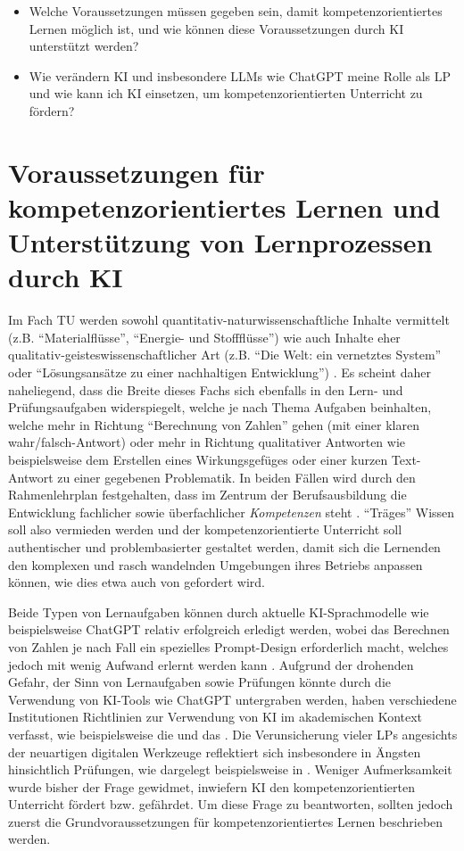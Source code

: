 \begin{itemize}
\item Welche Voraussetzungen müssen gegeben sein, damit kompetenzorientiertes Lernen möglich ist, und wie können diese Voraussetzungen durch \gls{KI} unterstützt werden?
\item Wie verändern \gls{KI} und insbesondere \glspl{LLM} wie ChatGPT meine Rolle als \gls{LP} und wie kann ich \gls{KI} einsetzen, um kompetenzorientierten Unterricht zu fördern?
\end{itemize}

\section{Voraussetzungen für kompetenzorientiertes Lernen und Unterstützung von Lernprozessen durch \gls{KI}}

Im Fach \gls{TU} werden sowohl quantitativ-naturwissenschaftliche Inhalte vermittelt (z.B. ``Materialflüsse'', ``Energie- und Stoffflüsse'') wie auch Inhalte eher qualitativ-geisteswissenschaftlicher Art (z.B. ``Die Welt: ein vernetztes System'' oder ``Lösungsansätze zu einer nachhaltigen Entwicklung'') \cite{sbfi}. Es scheint daher naheliegend, dass die Breite dieses Fachs sich ebenfalls in den Lern- und Prüfungsaufgaben widerspiegelt, welche je nach Thema Aufgaben beinhalten, welche mehr in Richtung ``Berechnung von Zahlen'' gehen (mit einer klaren wahr/falsch-Antwort) oder mehr in Richtung qualitativer Antworten wie beispielsweise dem Erstellen eines Wirkungsgefüges oder einer kurzen Text-Antwort zu einer gegebenen Problematik. In beiden Fällen wird durch den Rahmenlehrplan festgehalten, dass im Zentrum der Berufsausbildung die Entwicklung fachlicher sowie überfachlicher \textit{Kompetenzen} steht \cite[7-8]{sbfi}. ``Träges'' Wissen soll also vermieden werden und der kompetenzorientierte Unterricht soll authentischer und problembasierter gestaltet werden, damit sich die Lernenden den komplexen und rasch wandelnden Umgebungen ihres Betriebs anpassen können, wie dies etwa auch von \textcite[107-117]{alma99117272661305511} gefordert wird.

Beide Typen von Lernaufgaben können durch aktuelle \gls{KI}-Sprachmodelle wie beispielsweise ChatGPT relativ erfolgreich erledigt werden, wobei das Berechnen von Zahlen je nach Fall ein spezielles Prompt-Design erforderlich macht, welches jedoch mit wenig Aufwand erlernt werden kann \cite{bfh}. Aufgrund der drohenden Gefahr, der Sinn von Lernaufgaben sowie Prüfungen könnte durch die Verwendung von \gls{KI}-Tools wie ChatGPT untergraben werden, haben verschiedene Institutionen Richtlinien zur Verwendung von \gls{KI} im akademischen Kontext verfasst, wie beispielsweise die \textcite{bfh} und das \textcite{bbz}. Die Verunsicherung vieler \glspl{LP} angesichts der neuartigen digitalen Werkzeuge reflektiert sich insbesondere in Ängsten hinsichtlich Prüfungen, wie dargelegt beispielsweise in \cite{bund}. Weniger Aufmerksamkeit wurde bisher der Frage gewidmet, inwiefern \gls{KI} den kompetenzorientierten Unterricht fördert bzw. gefährdet. Um diese Frage zu beantworten, sollten jedoch zuerst die Grundvoraussetzungen für kompetenzorientiertes Lernen beschrieben werden.

